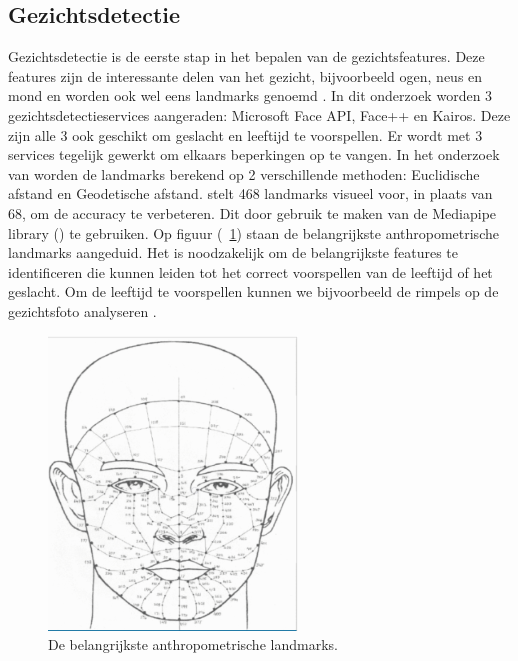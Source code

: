 \subsection{Gezichtsdetectie}
\label{sub:gezichtsdetectie}
Gezichtsdetectie is de eerste stap in het bepalen van de gezichtsfeatures. Deze features zijn de interessante delen van het gezicht, bijvoorbeeld ogen, neus en mond en worden ook wel eens landmarks genoemd \autocite{Coppens2018}. In dit onderzoek worden 3 gezichtsdetectieservices aangeraden: Microsoft Face API, Face++ en Kairos. Deze zijn alle 3 ook geschikt om geslacht en leeftijd te voorspellen. Er wordt met 3 services tegelijk gewerkt om elkaars beperkingen op te vangen. 
In het onderzoek van \textcite{Sanil2023} worden de landmarks berekend op 2 verschillende methoden: Euclidische afstand en Geodetische afstand. 
\textcite{Sanil2023} stelt 468 landmarks visueel voor, in plaats van 68, om de accuracy te verbeteren. Dit door gebruik te maken van de Mediapipe library (\textcite{Zubair2021}) te gebruiken. Op figuur (~\ref{fig:landmarks}) staan de belangrijkste anthropometrische landmarks aangeduid. Het is noodzakelijk om de belangrijkste features te identificeren die kunnen leiden tot het correct voorspellen van de leeftijd of het geslacht. Om de leeftijd te voorspellen kunnen we bijvoorbeeld de rimpels op de gezichtsfoto analyseren \autocite{Kwon1994}. 
\begin{figure}
    \centering
    \includegraphics[width=\columnwidth]{graphics/faciallandmarks.png}
    \caption{\label{fig:landmarks}De belangrijkste anthropometrische landmarks\autocite{Sanil2023}.}
\end{figure}

